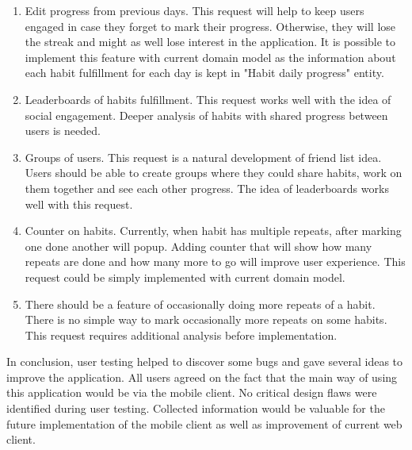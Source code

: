 \begin{enumerate}
    \item Edit progress from previous days.
        This request will help to keep users engaged in case they forget to mark their progress.
        Otherwise, they will lose the streak and might as well lose interest in the application.
        It is possible to implement this feature with current domain model as the information about each habit fulfillment for each day is kept in "Habit daily progress" entity.
    \item Leaderboards of habits fulfillment.
        This request works well with the idea of social engagement.
        Deeper analysis of habits with shared progress between users is needed.
    \item Groups of users.
        This request is a natural development of friend list idea.
        Users should be able to create groups where they could share habits, work on them together and see each other progress.
        The idea of leaderboards works well with this request.
    \item Counter on habits.
        Currently, when habit has multiple repeats, after marking one done another will popup.
        Adding counter that will show how many repeats are done and how many more to go will improve user experience.
        This request could be simply implemented with current domain model.
    \item There should be a feature of occasionally doing more repeats of a habit.
        There is no simple way to mark occasionally more repeats on some habits.
        This request requires additional analysis before implementation.
\end{enumerate}

In conclusion, user testing helped to discover some bugs and gave several ideas to improve the application.
All users agreed on the fact that the main way of using this application would be via the mobile client.
No critical design flaws were identified during user testing.
Collected information would be valuable for the future implementation of the mobile client as well as improvement of current web client.